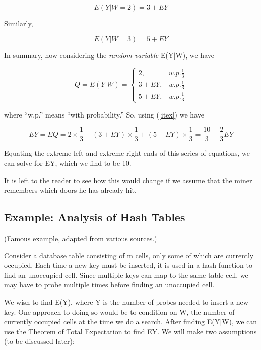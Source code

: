 \documentclass[11pt]{article}
\begin{document}
\begin{equation}
E(Y|W=2)=3+EY
\end{equation}


Similarly, 

\begin{equation}
E(Y|W=3)=5+EY
\end{equation}

In summary, now considering the \textit{random variable} E(Y$|$W), we have

\begin{equation}
Q=E(Y|W)=\left\{ \begin{array}{rl}
2, & w.p.\frac{1}{3}\\
3+EY, & w.p.\frac{1}{3}\\
5+EY, & w.p.\frac{1}{3}
\end{array}\right. 
\end{equation}

where ``w.p.'' means ``with probability.'' So, using (\ref{itex}) we have

\begin{equation}
EY=EQ=2\times \frac{1}{3}+(3+EY)\times \frac{1}{3}+(5+EY)\times \frac{1}{3}=\frac{10}{3}+\frac{2}{3}EY
\end{equation}

Equating the extreme left and extreme right ends of this series of equations,
we can solve for EY, which we find to be 10.


It is left to the reader to see how this would change if we assume that the
miner remembers which doors he has already hit.

\subsection{Example:  Analysis of Hash Tables}

(Famous example, adapted from various sources.)

Consider a database table consisting of m cells, only some of which are
currently occupied. Each time a new key must be inserted, it is used in
a hash function to find an unoccupied cell. Since multiple keys can map to
the same table cell, we may have to probe multiple times before finding
an unoccupied cell.

We wish to find E(Y), where Y is the number of probes needed to insert a
new key.  One approach to doing so would be to condition on W, the
number of currently occupied cells at the time we do a search.  After
finding E(Y$|$W), we can use the Theorem of Total Expectation to find
EY.  We will make two assumptions (to be discussed later):
\end{document}
